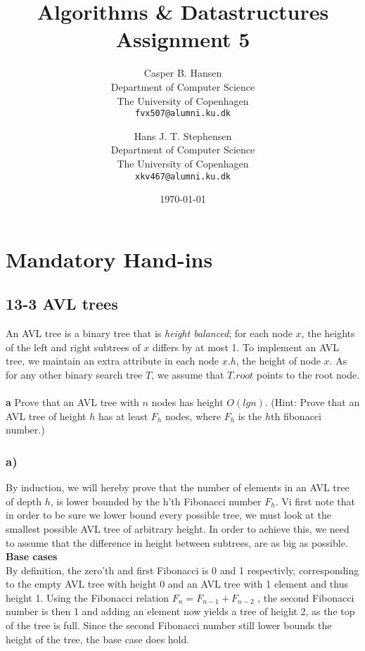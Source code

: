 \documentclass[11pt,english]{article}
\title
{
	\vspace{1in}
	Algorithms \& Datastructures\\
	\huge Assignment 5
}
\author
{
	Casper B. Hansen\\
	\small Department of Computer Science\\
	\small The University of Copenhagen\\
	\texttt{fvx507@alumni.ku.dk}
	\and
	Hans J. T. Stephensen\\
	\small Department of Computer Science\\
	\small The University of Copenhagen\\
	\texttt{xkv467@alumni.ku.dk}
}
\date{\today}
\begin{document}
\clearpage
\maketitle
\thispagestyle{empty}


\newpage
\pagestyle{fancy}

\section*{Mandatory Hand-ins}

\subsection*{13-3 AVL trees}
\large{An AVL tree is a binary tree that is \textit{height balanced}; for each
node $x$, the heights of the left and right subtrees of $x$ differs by at most
1. To implement an AVL tree, we maintain an extra attribute in each node $x.h$,
the height of node $x$. As for any other binary search tree $T$, we assume
that $T.root$ points to the root node.}
\\\\
\noindent \large{\textbf{a} \mdseries Prove that an AVL tree with $n$ nodes
has height $O(lg n)$. (Hint: Prove that an AVL tree of height $h$ has at
least $F_h$ nodes, where $F_h$ is the $h$th fibonacci number.)}
\\

\subsubsection*{a)}

By induction, we will hereby prove that the number of elements in an AVL tree of 
depth $h$, is lower bounded by the h'th Fibonacci number $F_h$. Vi first note 
that in order to be sure we lower bound every possible tree, we must look at 
the smallest possible AVL tree of arbitrary height. In order to achieve this,
we need to assume that the difference in height between subtrees, are as big
as possible.\\[5pt]

\textbf{Base cases} \\[5pt]

\noindent
By definition, the zero'th and first Fibonacci is 0 and 1 respectivly, 
corresponding to the empty AVL tree with height 0 and an AVL tree with 1 
element and thus height 1. Using the Fibonacci relation $F_n = F_{n-1} + F_{n-2}$
, the second Fibonacci number is then 1 and adding an element now yields a tree 
of height 2, as the top of the tree is full. Since the second Fibonacci number 
still lower bounds the height of the tree, the base case does hold.\\[5pt]
\end{document}
